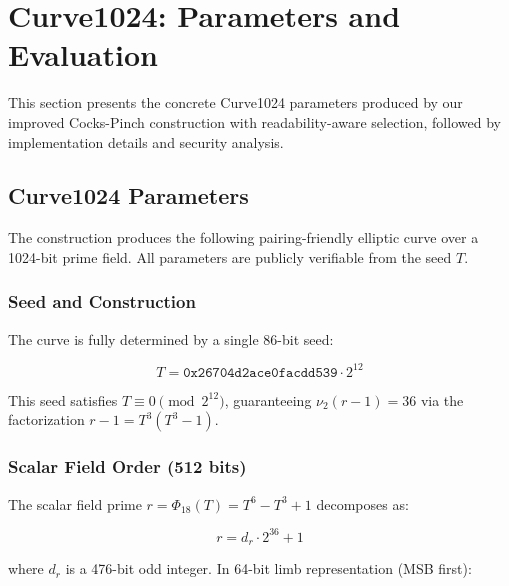 \section{Curve1024: Parameters and Evaluation}

This section presents the concrete Curve1024 parameters produced by our
improved Cocks-Pinch construction with readability-aware selection,
followed by implementation details and security analysis.

\subsection{Curve1024 Parameters}\label{curve1024-parameters}

The construction produces the following pairing-friendly elliptic curve
over a 1024-bit prime field. All parameters are publicly verifiable from
the seed \(T\).

\subsubsection{Seed and Construction}\label{seed-and-construction}

The curve is fully determined by a single 86-bit seed:

\[T = \texttt{0x26704d2ace0facdd539} \cdot 2^{12}\]

This seed satisfies \(T \equiv 0 \pmod{2^{12}}\), guaranteeing
\(\nu_2(r-1) = 36\) via the factorization \(r - 1 = T^3(T^3 - 1)\).

\subsubsection{Scalar Field Order (512
bits)}\label{scalar-field-order-512-bits}

The scalar field prime \(r = \Phi_{18}(T) = T^6 - T^3 + 1\) decomposes
as:

\[r = d_r \cdot 2^{36} + 1\]

where \(d_r\) is a 476-bit odd integer. In 64-bit limb representation
(MSB first):

